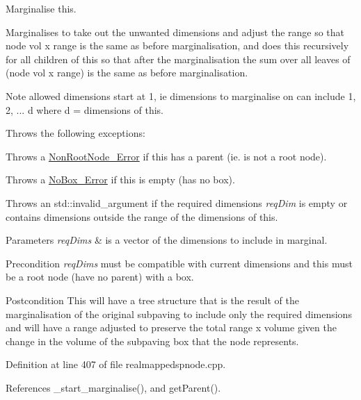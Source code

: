 \-Marginalise this. 

\-Marginalises to take out the unwanted dimensions and adjust the range so that node vol x range is the same as before marginalisation, and does this recursively for all children of this so that after the marginalisation the sum over all leaves of (node vol x range) is the same as before marginalisation.

\begin{DoxyNote}{\-Note}
allowed dimensions start at 1, ie dimensions to marginalise on can include 1, 2, ... d where d = dimensions of this.
\end{DoxyNote}
\-Throws the following exceptions\-: 
\begin{DoxyItemize}
\item \-Throws a \hyperlink{classsubpavings_1_1NonRootNode__Error}{\-Non\-Root\-Node\-\_\-\-Error} if this has a parent (ie. is not a root node). 
\item \-Throws a \hyperlink{classsubpavings_1_1NoBox__Error}{\-No\-Box\-\_\-\-Error} if this is empty (has no box). 
\item \-Throws an std\-::invalid\-\_\-argument if the required dimensions {\itshape req\-Dim\/} is empty or contains dimensions outside the range of the dimensions of this. 
\end{DoxyItemize}


\begin{DoxyParams}{\-Parameters}
{\em req\-Dims} & is a vector of the dimensions to include in marginal. \\
\hline
\end{DoxyParams}
\begin{DoxyPrecond}{\-Precondition}
{\itshape req\-Dims\/} must be compatible with current dimensions and this must be a root node (have no parent) with a box. 
\end{DoxyPrecond}
\begin{DoxyPostcond}{\-Postcondition}
\-This will have a tree structure that is the result of the marginalisation of the original subpaving to include only the required dimensions and will have a range adjusted to preserve the total range x volume given the change in the volume of the subpaving box that the node represents. 
\end{DoxyPostcond}


\-Definition at line 407 of file realmappedspnode.\-cpp.



\-References \-\_\-start\-\_\-marginalise(), and get\-Parent().


